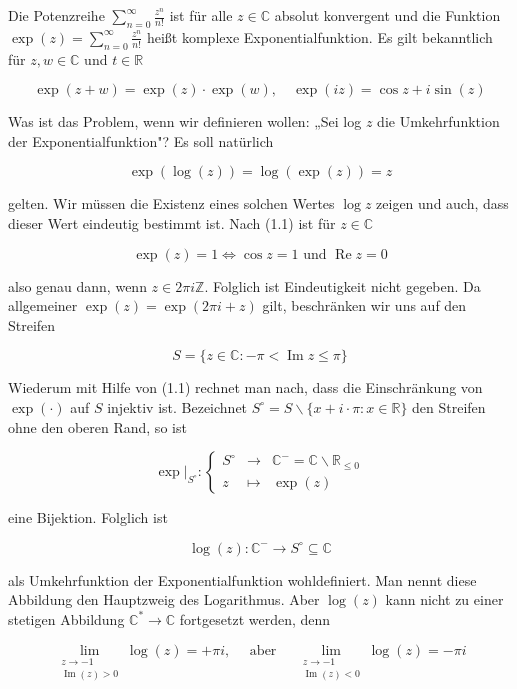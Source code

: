 \documentclass[10pt, letterpaper]{article}
\begin{document}
Die Potenzreihe $\sum_{n=0}^{\infty} \frac{z^{n}}{n!}$ ist für alle $z \in \mathbb{C}$ absolut konvergent und die Funktion $\exp (z)=\sum_{n=0}^{\infty} \frac{z^{n}}{n!}$ heißt komplexe Exponentialfunktion. Es gilt bekanntlich für $z, w \in \mathbb{C}$ und $t \in \mathbb{R}$

$$
\exp (z+w)=\exp (z) \cdot \exp (w), \quad \exp (i z)=\cos z+i \sin (z)
$$

Was ist das Problem, wenn wir definieren wollen: „Sei log $z$ die Umkehrfunktion der Exponentialfunktion"? Es soll natürlich

$$
\exp (\log (z))=\log (\exp (z))=z
$$

gelten. Wir müssen die Existenz eines solchen Wertes $\log z$ zeigen und auch, dass dieser Wert eindeutig bestimmt ist. Nach (1.1) ist für $z \in \mathbb{C}$

$$
\exp (z)=1 \Leftrightarrow \cos z=1 \text { und } \operatorname{Re} z=0
$$

also genau dann, wenn $z \in 2 \pi i \mathbb{Z}$. Folglich ist Eindeutigkeit nicht gegeben. Da allgemeiner $\exp (z)=\exp (2 \pi i+z)$ gilt, beschränken wir uns auf den Streifen

$$
S=\{z \in \mathbb{C}:-\pi<\operatorname{Im} z \leq \pi\}
$$

Wiederum mit Hilfe von (1.1) rechnet man nach, dass die Einschränkung von $\exp (\cdot)$ auf $S$ injektiv ist. Bezeichnet $S^{\circ}=S \backslash\{x+i \cdot \pi: x \in \mathbb{R}\}$ den Streifen ohne den oberen Rand, so ist

$$
\left.\exp \right|_{S^{\circ}}:\left\{\begin{array}{rll}
S^{\circ} & \longrightarrow & \mathbb{C}^{-}=\mathbb{C} \backslash \mathbb{R}_{\leq 0} \\
z & \longmapsto & \exp (z)
\end{array}\right.
$$

eine Bijektion. Folglich ist

$$
\log (z): \mathbb{C}^{-} \longrightarrow S^{\circ} \subseteq \mathbb{C}
$$

als Umkehrfunktion der Exponentialfunktion wohldefiniert. Man nennt diese Abbildung den Hauptzweig des Logarithmus. Aber $\log (z)$ kann nicht zu einer stetigen Abbildung $\mathbb{C}^{*} \longrightarrow \mathbb{C}$ fortgesetzt werden, denn

$$
\lim _{\substack{z \rightarrow-1 \\ \operatorname{Im}(z)>0}} \log (z)=+\pi i, \quad \text { aber } \quad \lim _{\substack{z \rightarrow-1 \\ \operatorname{Im}(z)<0}} \log (z)=-\pi i
$$
\end{document}
